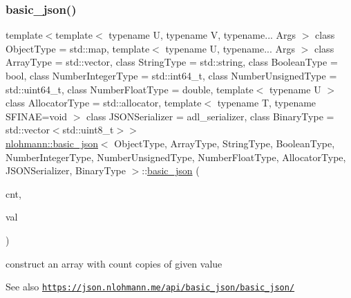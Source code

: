 \subsubsection{\texorpdfstring{basic\+\_\+json()}{basic\_json()}\hspace{0.1cm}{\footnotesize\ttfamily [6/9]}}
{\footnotesize\ttfamily template$<$template$<$ typename U, typename V, typename... Args $>$ class Object\+Type = std\+::map, template$<$ typename U, typename... Args $>$ class Array\+Type = std\+::vector, class String\+Type  = std\+::string, class Boolean\+Type  = bool, class Number\+Integer\+Type  = std\+::int64\+\_\+t, class Number\+Unsigned\+Type  = std\+::uint64\+\_\+t, class Number\+Float\+Type  = double, template$<$ typename U $>$ class Allocator\+Type = std\+::allocator, template$<$ typename T, typename S\+F\+I\+N\+A\+E=void $>$ class J\+S\+O\+N\+Serializer = adl\+\_\+serializer, class Binary\+Type  = std\+::vector$<$std\+::uint8\+\_\+t$>$$>$ \\
\hyperlink{classnlohmann_1_1basic__json}{nlohmann\+::basic\+\_\+json}$<$ Object\+Type, Array\+Type, String\+Type, Boolean\+Type, Number\+Integer\+Type, Number\+Unsigned\+Type, Number\+Float\+Type, Allocator\+Type, J\+S\+O\+N\+Serializer, Binary\+Type $>$\+::\hyperlink{classnlohmann_1_1basic__json}{basic\+\_\+json} (\begin{DoxyParamCaption}\item[{\hyperlink{classnlohmann_1_1basic__json_a3ada29bca70b4965f6fd37ec1c8f85f7}{size\+\_\+type}}]{cnt,  }\item[{const \hyperlink{classnlohmann_1_1basic__json}{basic\+\_\+json}$<$ Object\+Type, Array\+Type, String\+Type, Boolean\+Type, Number\+Integer\+Type, Number\+Unsigned\+Type, Number\+Float\+Type, Allocator\+Type, J\+S\+O\+N\+Serializer, Binary\+Type $>$ \&}]{val }\end{DoxyParamCaption})\hspace{0.3cm}{\ttfamily [inline]}}



construct an array with count copies of given value 

\begin{DoxySeeAlso}{See also}
\href{https://json.nlohmann.me/api/basic_json/basic_json/}{\tt https\+://json.\+nlohmann.\+me/api/basic\+\_\+json/basic\+\_\+json/} 
\end{DoxySeeAlso}
\mbox{\label{classnlohmann_1_1basic__json_a23e540f473d32f1cf5d3243ea3ad495e}} 
